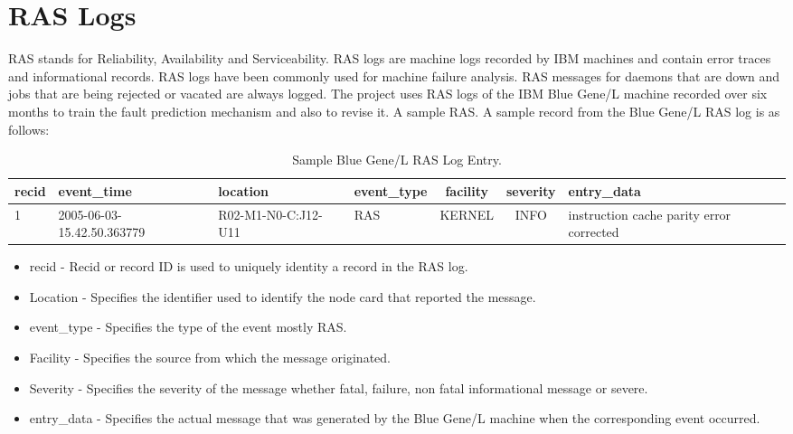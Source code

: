 \section{RAS Logs}
RAS stands for Reliability, Availability and Serviceability. RAS logs are machine logs recorded by IBM machines and contain error traces and informational records. RAS logs have been commonly used for machine failure analysis. RAS messages for daemons that are down and jobs that are being rejected or vacated are always logged. The project uses RAS logs of the IBM Blue Gene/L machine recorded over six months to train the fault prediction mechanism and also to revise it. A sample RAS. A sample record from the Blue Gene/L RAS log is as follows:
\begin{table}[h]
\begin{center}
\small
\begin{tabular}{| p{1cm} | p{2.5cm} | p{1.5cm} | p{2cm} | c | c | p{3cm} |}
\hline	
	\bf{recid} & \bf{event\_time} & \bf{location} & \bf{event\_type} & \bf{facility} & \bf{severity} & \bf{entry\_data} \\ \hline
	1 & 2005-06-03-15.42.50.363779 & R02-M1-N0-C:J12-U11 & RAS & KERNEL & INFO & instruction cache parity error corrected \\ \hline
\end{tabular}
\label{table2}
\end{center}
	\caption{Sample Blue Gene/L RAS Log Entry.}
\end{table}
\begin{itemize}
	\item recid - Recid or record ID is used to uniquely identity a record in the RAS log.
	\item Location - Specifies the identifier used to identify the node card that reported the message.
	\item event\_type - Specifies the type of the event mostly RAS.
	\item Facility - Specifies the source from which the message originated.
	\item Severity - Specifies the severity of the message whether fatal, failure, non fatal informational message or severe.
	\item entry\_data - Specifies the actual message that was generated by the Blue Gene/L machine when the corresponding event occurred.
\end{itemize}

